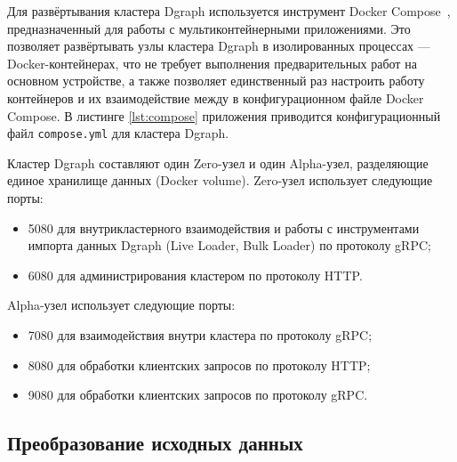 Для развёртывания кластера Dgraph используется инструмент Docker Compose~\cite{dockerCompose},
предназначенный для работы с мультиконтейнерными приложениями. Это позволяет развёртывать узлы
кластера Dgraph в изолированных процессах --- Docker-контейнерах, что не требует выполнения
предварительных работ на основном устройстве, а также позволяет единственный раз настроить работу контейнеров
и их взаимодействие между в конфигурационном файле Docker Compose. В листинге \ref{lst:compose} приложения
приводится конфигурационный файл \texttt{compose.yml} для кластера Dgraph.

Кластер Dgraph составляют один Zero-узел и один Alpha-узел, разделяющие единое хранилище данных
(Docker volume). Zero-узел использует следующие порты:
\begin{itemize}
    \item 5080 для внутрикластерного взаимодействия и работы с инструментами импорта данных Dgraph
(Live Loader, Bulk Loader) по протоколу gRPC;
    \item 6080 для администрирования кластером по протоколу HTTP.
\end{itemize}
Alpha-узел использует следующие порты:
\begin{itemize}
    \item 7080 для взаимодействия внутри кластера по протоколу gRPC;
    \item 8080 для обработки клиентских запросов по протоколу HTTP;
    \item 9080 для обработки клиентских запросов по протоколу gRPC.
\end{itemize}



\subsection{Преобразование исходных данных}

